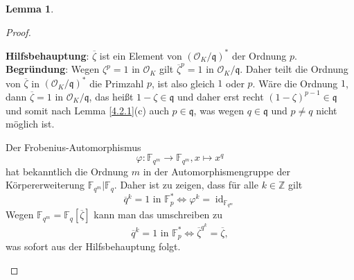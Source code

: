 \documentclass[
twoside=semi,
fontsize=12,
DIV=12, 
cleardoublepage=current,
leqno,
headings=optiontoheadandtoc, 
toc=idx
]{scrbook}
\newcommand{\Z}{\mathbb{Z}}
\newcommand{\F}{\mathbb{F}}
\DeclareMathOperator{\id}{id}
\theoremstyle{definition}
\newtheorem{lemma}[definition]{Lemma}
\begin{document}
\begin{lemma}
\begin{proof}
\begin{enumerate}[(a)]
				\begin{tcolorbox}[colback=white,colframe=blue,arc=0cm]
				 	\textbf{Hilfsbehauptung}: $\overline{\zeta}$ ist ein Element von $(\mathcal{O}_K/\mathfrak{q})^*$ der Ordnung $p$.
					\tcblower
					\textbf{Begr\"undung}: Wegen $\zeta^p = 1$ in $\mathcal{O}_K$ gilt $\overline{\zeta}^p = 1$ in $\mathcal{O}_K/\mathfrak{q}$. Daher teilt die Ordnung von $\overline{\zeta}$ in
					$(\mathcal{O}_K/\mathfrak{q})^*$ die Primzahl $p$, ist also gleich $1$ oder $p$. W\"are die Ordnung $1$, dann $\overline{\zeta} = 1$ in $\mathcal{O}_K/\mathfrak{q}$, das hei\ss t
					$1 - \zeta \in \mathfrak{q}$ und daher erst recht $(1-\zeta)^{p-1} \in \mathfrak{q}$ und somit nach Lemma \ref{4.2.1}(c) auch $p \in \mathfrak{q}$, was wegen
					$q \in \mathfrak{q}$ und $p \neq q$ nicht m\"oglich ist.
				\end{tcolorbox}

				Der Frobenius-Automorphismus 
					\[\varphi: \F_{q^m} \to \F_{q^m}, x \mapsto x^q\]
				hat bekanntlich die Ordnung $m$ in der Automorphismengruppe der K\"orpererweiterung $\F_{q^m}|\F_{q}$. Daher ist zu zeigen, dass f\"ur alle $k \in \Z$ gilt
					\[\overline{q}^k = 1 \textrm{ in } \F_{p}^* \Longleftrightarrow \varphi^k = \id_{\F_{q^m}}\]
				Wegen $\F_{q^m} = \F_{q}[\overline{\zeta}]$ kann man das umschreiben zu
					\[\overline{q}^k = 1 \textrm{ in } \F_{p}^* \Longleftrightarrow \overline{\zeta}^{q^k} = \overline{\zeta},\]
				was sofort aus der Hilfsbehauptung folgt.
			\end{enumerate}
		\end{proof}
 	\end{lemma}
 
\end{document}
